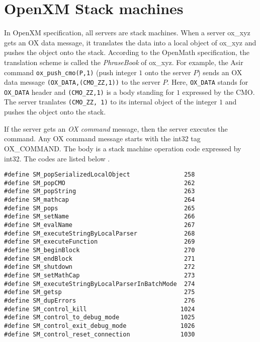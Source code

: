 
\section{OpenXM Stack machines}\label{sec:ox-stackmachines}

In OpenXM specification, all servers are stack machines.
When a server ox\_xyz gets an OX data message,
it translates the data into a local object of ox\_xyz
and pushes the object onto the stack.
According to the OpenMath specification, 
the translation scheme 
is called the {\it PhraseBook} of ox\_xyz.
For example, the Asir command {\tt ox\_push\_cmo(P,1)}
(push integer $1$ onto the server $P$)
sends an OX data message
{\tt (OX\_DATA,(CMO\_ZZ,1))} to the server $P$.
Here,
{\tt OX\_DATA} stands for {\tt OX\_DATA} header and 
{\tt (CMO\_ZZ,1)} is a body standing for $1$ expressed 
by the CMO.
The server tranlates {\tt (CMO\_ZZ, 1)} to its internal object of
the integer  $1$
and pushes the object onto the stack.

If the server gets an {\it OX command} message, then the server 
executes the command.
Any OX command message starts with the int32 tag OX\_COMMAND.
The body is a stack machine operation code expressed by int32.
The codes are listed below \cite{noro-takayama}.
\begin{verbatim}
#define SM_popSerializedLocalObject               258
#define SM_popCMO                                 262
#define SM_popString                              263
#define SM_mathcap                                264
#define SM_pops                                   265
#define SM_setName                                266
#define SM_evalName                               267
#define SM_executeStringByLocalParser             268
#define SM_executeFunction                        269
#define SM_beginBlock                             270
#define SM_endBlock                               271
#define SM_shutdown                               272
#define SM_setMathCap                             273
#define SM_executeStringByLocalParserInBatchMode  274
#define SM_getsp                                  275
#define SM_dupErrors                              276
#define SM_control_kill                          1024
#define SM_control_to_debug_mode                 1025
#define SM_control_exit_debug_mode               1026
#define SM_control_reset_connection              1030
\end{verbatim}

